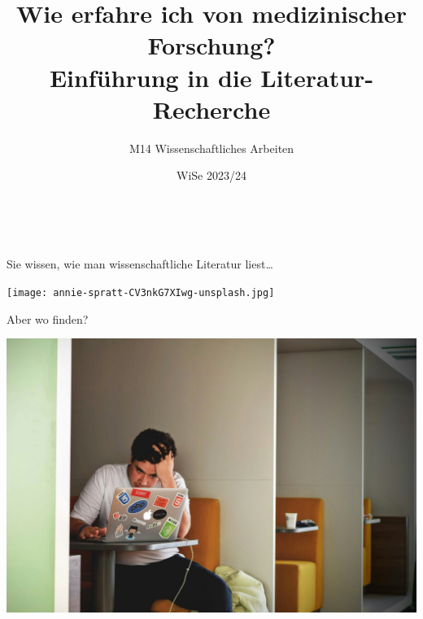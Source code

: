 \documentclass{beamer}
\title[Literatur-Recherche]{Wie erfahre ich von medizinischer Forschung? \\
Einführung in die Literatur-Recherche}
\author[melanie.stefan@medicalschool-berlin.de]{M14 Wissenschaftliches Arbeiten}
\institute[]{Prof. Melanie Stefan - melanie.stefan@medicalschool-berlin.de}
\date{WiSe 2023/24}
\begin{document}
 
 
 
{  
\begin{frame}

 \maketitle 

$\,$\\[6cm] 


\end{frame} 
}



 
\begin{frame}{Sie wissen, wie man wissenschaftliche Literatur liest\dots}

\begin{center}
    \texttt{[image: annie-spratt-CV3nkG7XIwg-unsplash.jpg]}
\end{center}

    
\end{frame}


\begin{frame}{Aber wo finden?}

\begin{center}
    \includegraphics[width=\textwidth]{tim-gouw-1K9T5YiZ2WU-unsplash.jpg}
\end{center}

    
\end{frame}
\end{document}

